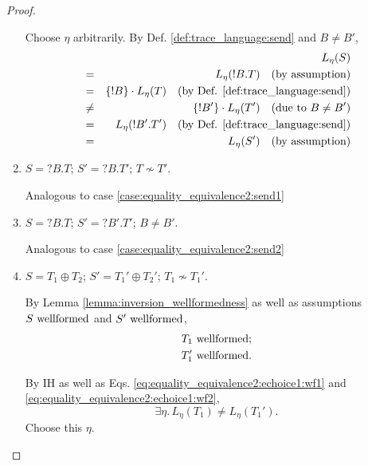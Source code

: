 \documentclass{llncs}
\newcommand*{\nsequiv}{\not\sim}
\newcommand*{\send}{\mathord{!}}
\newcommand*{\recv}{\mathord{?}}
\newcommand*{\echoice}{\oplus}
\newcommand*{\concat}{\cdot}
\newcommand*{\wf}[1]{\text{$#1$ {\normalfont \rmfamily wellformed}}}
\renewcommand*{\|}{\;|\;}
\begin{document}
\begin{proof}
\begin{enumerate}
      Choose $\eta$ arbitrarily.
      By Def. \ref{def:trace_language:send} and $B \neq B'$,
      \begin{eqnarray*}
        &&     L_\eta(S) \\
        &=&    L_\eta(\send B.T)
               \quad \text{(by assumption)} \\
        &=&    \{\send B\} \concat L_\eta(T)
               \quad \text{(by Def. \ref{def:trace_language:send})} \\
        &\neq& \{\send B'\} \concat L_\eta(T')
               \quad \text{(due to $B \neq B'$)} \\
        &=&    L_\eta(\send B'.T')
               \quad \text{(by Def. \ref{def:trace_language:send})} \\
        &=&    L_\eta(S')
               \quad \text{(by assumption)}
      \end{eqnarray*}

    \item
      \label{case:equality_equivalence2:recv1}
      $S = \recv B.T$; $S' = \recv B.T'$; $T \nsequiv T'$.

      Analogous to case \ref{case:equality_equivalence2:send1}

    \item
      \label{case:equality_equivalence2:recv2}
      $S = \recv B.T$; $S' = \recv B'.T'$; $B \neq B'$.

      Analogous to case \ref{case:equality_equivalence2:send2}

    \item
      \label{case:equality_equivalence2:echoice1}
      $S = T_1 \echoice T_2$; $S' = T_1' \echoice T_2'$; $T_1 \nsequiv T_1'$.

      By Lemma \ref{lemma:inversion_wellformedness} as well as assumptions
      $\wf{S}$ and $\wf{S'}$,
      \begin{eqnarray}
        \label{eq:equality_equivalence2:echoice1:wf1}
        \wf{T_1}; \\
        \label{eq:equality_equivalence2:echoice1:wf2}
        \wf{T_1'}. \\
      \end{eqnarray}

      By IH as well as Eqs. \ref{eq:equality_equivalence2:echoice1:wf1} and
      \ref{eq:equality_equivalence2:echoice1:wf2},
      \begin{equation}
        \label{eq:equality_equivalence2:echoice1:neq}
        \exists \eta.\, L_\eta(T_1) \neq L_\eta(T_1').
      \end{equation}
      Choose this $\eta$.


\end{enumerate}
\end{proof}
\end{document}
